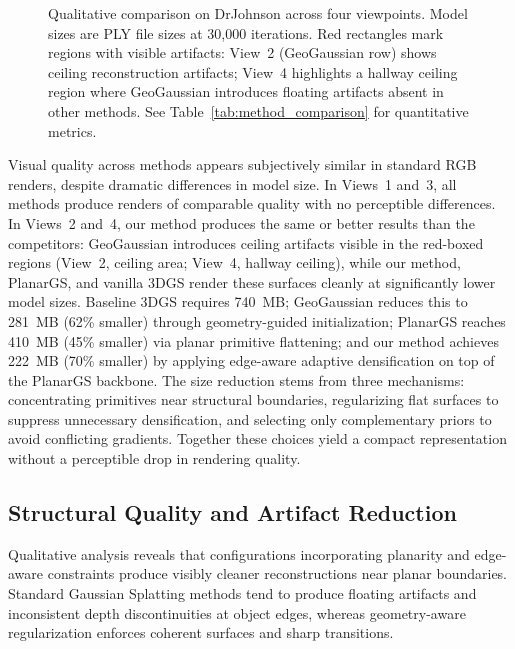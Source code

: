 \begin{figure}[p]
    \caption{Qualitative comparison on DrJohnson across four viewpoints. Model sizes are PLY file sizes at 30{,}000 iterations. Red rectangles mark regions with visible artifacts: View~2 (GeoGaussian row) shows ceiling reconstruction artifacts; View~4 highlights a hallway ceiling region where GeoGaussian introduces floating artifacts absent in other methods. See Table~\ref{tab:method_comparison} for quantitative metrics.}
    \label{fig:qualitative_comparison}
\end{figure}

Visual quality across methods appears subjectively similar in standard RGB renders, despite dramatic differences in model size. In Views~1 and~3, all methods produce renders of comparable quality with no perceptible differences. In Views~2 and~4, our method produces the same or better results than the competitors: GeoGaussian introduces ceiling artifacts visible in the red-boxed regions (View~2, ceiling area; View~4, hallway ceiling), while our method, PlanarGS, and vanilla 3DGS render these surfaces cleanly at significantly lower model sizes. Baseline 3DGS requires 740~MB; GeoGaussian reduces this to 281~MB (62\% smaller) through geometry-guided initialization; PlanarGS reaches 410~MB (45\% smaller) via planar primitive flattening; and our method achieves 222~MB (70\% smaller) by applying edge-aware adaptive densification on top of the PlanarGS backbone. The size reduction stems from three mechanisms: concentrating primitives near structural boundaries, regularizing flat surfaces to suppress unnecessary densification, and selecting only complementary priors to avoid conflicting gradients. Together these choices yield a compact representation without a perceptible drop in rendering quality.

\subsection{Structural Quality and Artifact Reduction}

Qualitative analysis reveals that configurations incorporating planarity and edge-aware constraints produce visibly cleaner reconstructions near planar boundaries. Standard Gaussian Splatting methods tend to produce floating artifacts and inconsistent depth discontinuities at object edges, whereas geometry-aware regularization enforces coherent surfaces and sharp transitions.

